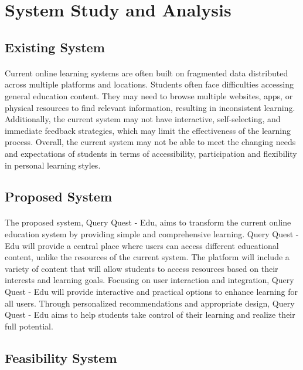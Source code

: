 \section{System Study and Analysis }

\subsection{Existing System }
\paragraph{}Current online learning systems are often built on fragmented data distributed across multiple platforms and locations. Students often face difficulties accessing general education content. They may need to browse multiple websites, apps, or physical resources to find relevant information, resulting in inconsistent learning. Additionally, the current system may not have interactive, self-selecting, and immediate feedback strategies, which may limit the effectiveness of the learning process. Overall, the current system may not be able to meet the changing needs and expectations of students in terms of accessibility, participation and flexibility in personal learning styles.

\subsection{Proposed System}
\paragraph{}The proposed system, Query Quest - Edu, aims to transform the current online education system by providing simple and comprehensive learning. Query Quest - Edu will provide a central place where users can access different educational content, unlike the resources of the current system. The platform will include a variety of content that will allow students to access resources based on their interests and learning goals. Focusing on user interaction and integration, Query Quest - Edu will provide interactive and practical options to enhance learning for all users. Through personalized recommendations and appropriate design, Query Quest - Edu aims to help students take control of their learning and realize their full potential.

\subsection{Feasibility System}

